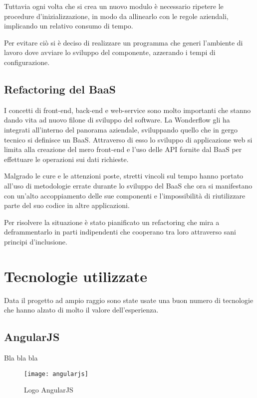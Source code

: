 Tuttavia ogni volta che si crea un nuovo modulo è necessario ripetere le
procedure d'inizializzazione, in modo da allinearlo con le regole aziendali,
implicando un relativo consumo di tempo.

Per evitare ciò si è deciso di realizzare un programma che generi l'ambiente di
lavoro dove avviare lo sviluppo del componente, azzerando i tempi di
configurazione.

\subsection{Refactoring del BaaS}
I concetti di \gls{front-end}, \gls{back-end} e \gls{web-service} sono molto
importanti che stanno dando vita ad nuovo filone di sviluppo del software.
La Wonderflow gli ha integrati all'interno del panorama aziendale, sviluppando
quello che in gergo tecnico si definisce un \gls{BaaS}. Attraverso
di esso lo sviluppo di applicazione web si limita alla creazione del mero
\gls{front-end} e l'uso delle \gls{API} fornite dal \gls{BaaS} per effettuare
le operazioni sui dati richieste.

Malgrado le cure e le attenzioni poste, stretti vincoli sul tempo hanno portato
all'uso di metodologie errate durante lo sviluppo del \gls{BaaS} che ora si
manifestano con un'alto accoppiamento delle sue componenti e l'impossibilità
di riutilizzare parte del suo codice in altre applicazioni.

Per risolvere la situazione è stato pianificato un \gls{refactoring} che mira
a deframmentarlo in parti indipendenti che cooperano tra loro attraverso
sani principi d'inclusione.

\section{Tecnologie utilizzate}
Data il progetto ad ampio raggio sono state usate una buon numero di tecnologie
che hanno alzato di molto il valore dell'esperienza.

\subsection{AngularJS}
Bla bla bla

\begin{figure}[h]
\begin{center}
\texttt{[image: angularjs]}
\caption{Logo AngularJS}
\label{fig:angularjs_logo}
\end{center}
\end{figure}

